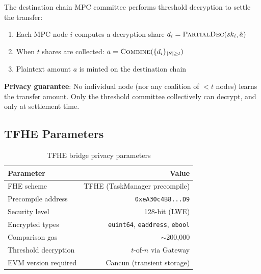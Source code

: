 The destination chain MPC committee performs threshold decryption to settle the transfer:

\begin{enumerate}
  \item Each MPC node $i$ computes a decryption share $d_i = \textsc{PartialDec}(sk_i, \hat{a})$
  \item When $t$ shares are collected: $a = \textsc{Combine}(\{d_i\}_{|S| \geq t})$
  \item Plaintext amount $a$ is minted on the destination chain
\end{enumerate}

\textbf{Privacy guarantee}: No individual node (nor any coalition of $< t$ nodes) learns the transfer amount. Only the threshold committee collectively can decrypt, and only at settlement time.

\subsection{TFHE Parameters}

\begin{table}[h]
\centering
\begin{tabular}{lr}
\toprule
\textbf{Parameter} & \textbf{Value} \\
\midrule
FHE scheme & TFHE (TaskManager precompile) \\
Precompile address & \texttt{0xeA30c4B8...D9} \\
Security level & 128-bit (LWE) \\
Encrypted types & \texttt{euint64}, \texttt{eaddress}, \texttt{ebool} \\
Comparison gas & $\sim$200,000 \\
Threshold decryption & $t$-of-$n$ via Gateway \\
EVM version required & Cancun (transient storage) \\
\bottomrule
\end{tabular}
\caption{TFHE bridge privacy parameters}
\end{table}

